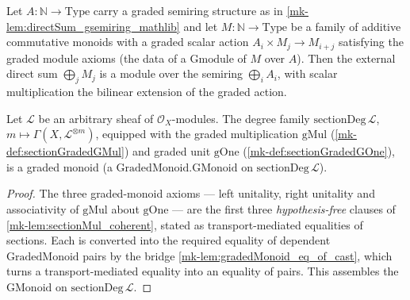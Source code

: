 \begin{lemma}
  \label{mk-lem:directSum_gmodule_mathlib}
  \mathlibok

  Let \(A : \mathbb{N} \to \mathrm{Type}\) carry a graded semiring structure as
  in \ref{mk-lem:directSum_gsemiring_mathlib} and let
  \(M : \mathbb{N} \to \mathrm{Type}\) be a family of additive commutative
  monoids with a graded scalar action \(A_i \times M_j \to M_{i+j}\) satisfying
  the graded module axioms (the data of a \(\mathrm{Gmodule}\) of \(M\) over
  \(A\)). Then the external direct sum \(\bigoplus_j M_j\) is a module over the
  semiring \(\bigoplus_i A_i\), with scalar multiplication the bilinear
  extension of the graded action.
\end{lemma}

\begin{lemma}\label{mk-lem:sectionGradedRing_gmonoid}
  \leanok

  Let \(\mathcal{L}\) be an arbitrary sheaf of \(\mathcal{O}_X\)-modules. The degree
  family \(\mathrm{sectionDeg}\,\mathcal{L}\), \(m \mapsto
  \Gamma(X,\mathcal{L}^{\otimes m})\), equipped with the graded multiplication
  \(\mathrm{gMul}\) (\ref{mk-def:sectionGradedGMul}) and graded unit \(\mathrm{gOne}\)
  (\ref{mk-def:sectionGradedGOne}), is a graded monoid (a
  \(\mathrm{GradedMonoid.GMonoid}\) on \(\mathrm{sectionDeg}\,\mathcal{L}\)).
\end{lemma}

\begin{proof}
  \leanok
  The three graded-monoid axioms --- left unitality, right unitality and
  associativity of \(\mathrm{gMul}\) about \(\mathrm{gOne}\) --- are the first three
  \emph{hypothesis-free} clauses of \ref{mk-lem:sectionMul_coherent}, stated as
  transport-mediated equalities of sections. Each is converted into the required
  equality of dependent \(\mathrm{GradedMonoid}\) pairs by the bridge
  \ref{mk-lem:gradedMonoid_eq_of_cast}, which turns a transport-mediated equality into an
  equality of pairs. This assembles the \(\mathrm{GMonoid}\) on
  \(\mathrm{sectionDeg}\,\mathcal{L}\).
\end{proof}

